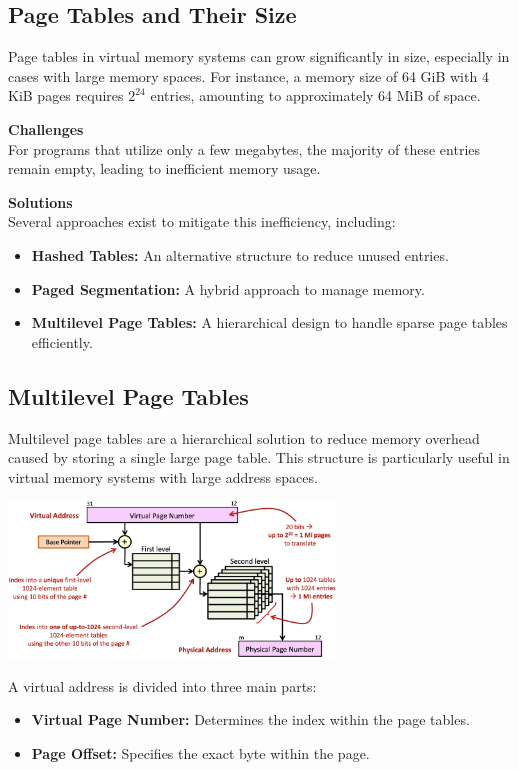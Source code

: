 \subsection{Page Tables and Their Size}
Page tables in virtual memory systems can grow significantly in size, especially in cases with large memory spaces. For instance, a memory size of 64 GiB with 4 KiB pages requires $2^{24}$ entries, amounting to approximately 64 MiB of space.

\textbf{Challenges} \\
For programs that utilize only a few megabytes, the majority of these entries remain empty, leading to inefficient memory usage.

\textbf{Solutions} \\
Several approaches exist to mitigate this inefficiency, including:
\begin{itemize}
    \item \textbf{Hashed Tables:} An alternative structure to reduce unused entries.
    \item \textbf{Paged Segmentation:} A hybrid approach to manage memory.
    \item \textbf{Multilevel Page Tables:} A hierarchical design to handle sparse page tables efficiently.
\end{itemize}

\subsection{Multilevel Page Tables}

Multilevel page tables are a hierarchical solution to reduce memory overhead caused by storing a single large page table. This structure is particularly useful in virtual memory systems with large address spaces.

\begin{center}
    \includegraphics[width=0.65\textwidth]{chapters/chapter3c/images/multipage.png}
\end{center}
A virtual address is divided into three main parts:
\begin{itemize}
    \item \textbf{Virtual Page Number:} Determines the index within the page tables.
    \item \textbf{Page Offset:} Specifies the exact byte within the page.
\end{itemize}

